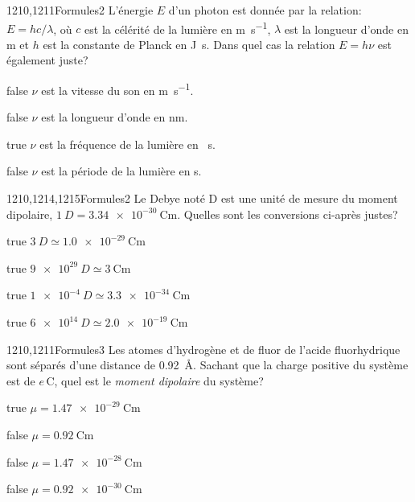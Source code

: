 		\begin{question}{1210,1211}{Formules}{2}{}
            L'énergie $E$ d'un photon est donnée par la relation: $E=hc/\lambda$, où $c$ est la célérité de la lumière en \si{\meter\per\second}, $\lambda$ est la longueur d'onde en \si{\meter} et $h$ est la constante de Planck en \si{\joule\second}. Dans quel cas la relation $E=h\nu$ est également juste?
        \end{question}
        \begin{reponses}
            \item[false] $\nu$ est la vitesse du son en \si{\meter\per\second}.
            \item[false] $\nu$ est la longueur d'onde en \si{\nano\meter}.
            \item[true] $\nu$ est la fréquence de la lumière en \si{\per\second}.
            \item[false] $\nu$ est la période de la lumière en \si{\second}.
        \end{reponses}
		\begin{question}{1210,1214,1215}{Formules}{2}{}
			Le Debye noté \si{D} est une unité de mesure du moment dipolaire, $\SI{1}{D} = \SI{3.34e-30}{\coulomb\meter}$. Quelles sont les conversions ci-après justes?
        \end{question}
        \begin{reponses}
    	    \item[true] $\SI{3}{D} \simeq  \SI{1.0e-29}{\coulomb\meter}$
    	    \item[true] $\SI{9e29}{D} \simeq  \SI{3}{\coulomb\meter}$
    	    \item[true] $\SI{1e-4}{D} \simeq  \SI{3.3e-34}{\coulomb\meter}$
    	    \item[true] $\SI{6e14}{D} \simeq  \SI{2.0e-19}{\coulomb\meter}$
        \end{reponses}
		\begin{question}{1210,1211}{Formules}{3}{}
			Les atomes d'hydrogène et de fluor de l'acide fluorhydrique sont séparés d'une distance de \SI{0.92}{\angstrom}. Sachant que la charge positive du système est de $e\,\si{\coulomb}$, quel est le \emph{moment dipolaire} du système?
        \end{question}
        \begin{reponses}
    	    \item[true] $\mu = \SI{1.47e-29}{\coulomb\meter}$
    	    \item[false] $\mu = \SI{0.92}{\coulomb\meter}$
    	    \item[false] $\mu = \SI{1.47e-28}{\coulomb\meter}$
    	    \item[false] $\mu = \SI{0.92e-30}{\coulomb\meter}$
        \end{reponses}
